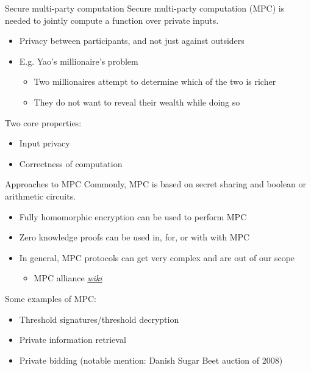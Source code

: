 \begin{frame}{Secure multi-party computation}
  Secure multi-party computation (MPC) is needed to jointly compute a function over private inputs.
  \begin{itemize}[<+(1)->]
    \item Privacy between participants, and not just against outsiders
    \item E.g. Yao's millionaire's problem
    \begin{itemize}
      \item Two millionaires attempt to determine which of the two is richer
      \item They do not want to reveal their wealth while doing so
    \end{itemize}
  \end{itemize}

  \pause
  Two core properties:
  \begin{itemize}[<+(1)->]
    \item Input privacy
    \item Correctness of computation
  \end{itemize}
\end{frame}

\begin{frame}{Approaches to MPC}
  Commonly, MPC is based on secret sharing and boolean or arithmetic circuits.
  \begin{itemize}[<+(1)->]
    \item Fully homomorphic encryption can be used to perform MPC
    \item Zero knowledge proofs can be used in, for, or with with MPC
    \item In general, MPC protocols can get very complex and are out of our scope
    \begin{itemize}
      \item MPC alliance \href{https://wiki.mpcalliance.org/protocols.html}{\textit{wiki}}
    \end{itemize}
  \end{itemize}

  \vspace*{1em}

  \pause
  Some examples of MPC:
  \begin{itemize}[<+(1)->]
    \item Threshold signatures/threshold decryption
    \item Private information retrieval
    \item Private bidding (notable mention: Danish Sugar Beet auction of 2008)
  \end{itemize}
\end{frame}

